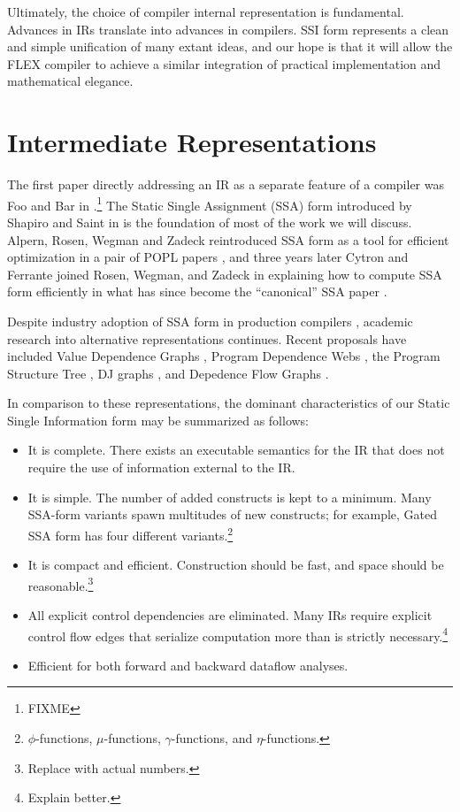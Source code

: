 \documentclass[12pt,notitlepage,twoside]{article}
\begin{document}
Ultimately, the choice of compiler internal representation is fundamental.
Advances in IRs translate into advances in compilers.  SSI form
represents a clean and simple unification of many extant ideas, and
our hope is that it will allow the FLEX compiler to achieve a similar
integration of practical implementation and mathematical elegance.

\section{Intermediate Representations}
The first paper directly addressing an IR as a separate feature of a
compiler was Foo and Bar in \cite{foobar}.\footnote{FIXME}
The Static Single Assignment (SSA) form introduced by Shapiro and
Saint in \cite{shapiro70:ssa} is the foundation of most of the
work we will discuss.  Alpern, Rosen, Wegman and Zadeck reintroduced
SSA form as a tool for efficient optimization in a pair of POPL
papers \cite{alpern88:ssa,rosen88:gvn}, and three years later Cytron
and Ferrante joined Rosen, Wegman, and Zadeck in explaining how to
compute SSA form efficiently in what has since become the 
``canonical'' SSA paper \cite{cytron89:ssa}.

Despite industry adoption of SSA form in production compilers
\cite{chow96:hssa,chow97:ssapre}, academic research into alternative
representations continues.
Recent proposals have included Value Dependence Graphs
\cite{weise94:vdg}, Program Dependence Webs \cite{ballance90:pdw},
the Program Structure Tree \cite{johnson94:pst},
DJ graphs \cite{sreedhar96:dj}, and Depedence Flow Graphs
\cite{johnson93:dfg}.

In comparison to these representations, the dominant characteristics of
our Static Single Information form may be summarized as follows:
\begin{itemize}
\item It is complete.  There exists an executable semantics
for the IR that does not require the use of information external to
the IR.
\item It is simple.  The number of added constructs is kept to a
minimum.  Many SSA-form variants spawn multitudes of new
constructs; for example, Gated SSA form \cite{ballance90:pdw,tu95:gssa}
has four different \phifunction{} variants.\footnote{$\phi$-functions,
$\mu$-functions, $\gamma$-functions, and $\eta$-functions.}
\item It is compact and efficient.  Construction should be fast, and
space should be reasonable.\footnote{Replace with actual numbers.}
\item All explicit control dependencies are eliminated.  Many IRs
require explicit control flow edges that serialize computation more
than is strictly necessary.\footnote{Explain better.}
\item Efficient for both forward and backward dataflow analyses.
\end{itemize}
\end{document}
